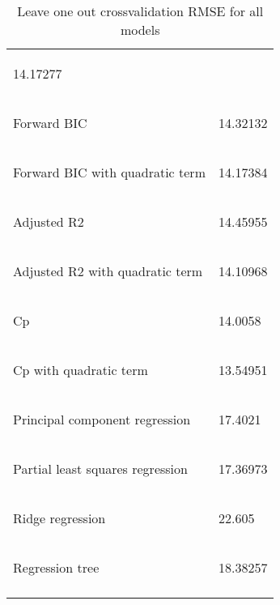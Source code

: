 \documentclass[a4paper]{article}
\begin{document}
\begin{longtable}{ l | p{10cm} }
\begin{Schunk}
\begin{Soutput}
14.17277
\end{Soutput}
\end{Schunk}
\\
Forward BIC &
\begin{Schunk}
\begin{Soutput}
14.32132
\end{Soutput}
\end{Schunk}
\\
Forward BIC with quadratic term&
\begin{Schunk}
\begin{Soutput}
14.17384
\end{Soutput}
\end{Schunk}
\\
Adjusted R2&
\begin{Schunk}
\begin{Soutput}
14.45955
\end{Soutput}
\end{Schunk}
\\
Adjusted R2 with quadratic term&
\begin{Schunk}
\begin{Soutput}
14.10968
\end{Soutput}
\end{Schunk}
\\
Cp&
\begin{Schunk}
\begin{Soutput}
14.0058
\end{Soutput}
\end{Schunk}
\\
Cp with quadratic term&
\begin{Schunk}
\begin{Soutput}
13.54951
\end{Soutput}
\end{Schunk}
\\
Principal component regression&
\begin{Schunk}
\begin{Soutput}
17.4021
\end{Soutput}
\end{Schunk}
\\
Partial least squares regression&
\begin{Schunk}
\begin{Soutput}
17.36973
\end{Soutput}
\end{Schunk}
\\
Ridge regression&
\begin{Schunk}
\begin{Soutput}
22.605
\end{Soutput}
\end{Schunk}
\\
Regression tree&
\begin{Schunk}
\begin{Soutput}
18.38257
\end{Soutput}
\end{Schunk}
\\
\caption{Leave one out crossvalidation RMSE for all models}
\label{tab:cross_valid}
\end{longtable}
\end{document}
